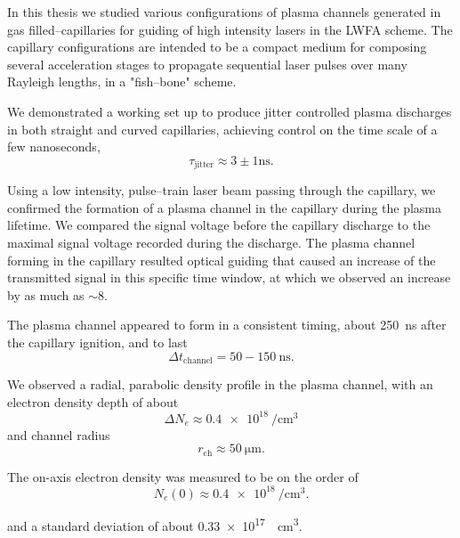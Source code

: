 \documentclass[../main.tex]{subfiles}
\begin{document}
In this thesis we studied various configurations of plasma channels generated in gas filled--capillaries for guiding of high intensity lasers in the LWFA scheme. The capillary configurations are intended to be a compact medium for composing several acceleration stages to propagate sequential laser pulses over many Rayleigh lengths, in a "fish--bone" scheme.

We demonstrated a working set up to produce jitter controlled plasma discharges in both straight and curved capillaries, achieving control on the time scale of a few nanoseconds\cite{andBeharEhudLowCapillary,BiagioniGasPulse},
\begin{equation*}
    	\tau_\text{jitter}\approx 3\pm 1\si{\ns}.
\end{equation*}

Using a low intensity, pulse--train laser beam passing through the capillary, we confirmed the formation of a plasma channel in the capillary during the plasma lifetime. We compared the signal voltage before the capillary discharge to the maximal signal voltage recorded during the discharge. The plasma channel forming in the capillary resulted optical guiding that caused an increase of the transmitted signal in this specific time window, at which we observed an increase by as much as $\sim 8$.

The plasma channel appeared to form in a consistent timing, about \SI{250}{\ns} after the capillary ignition, and to last 
\begin{equation*}
    \Delta t_\text{channel}=50-150\ \si{\ns}.
\end{equation*}

We observed a radial, parabolic density profile in the plasma channel, with an electron density depth of about 
$$\Delta N_e \approx\SI{0.4e18}{\per\cubic\cm}$$
and channel radius
$$r_\text{ch}\approx \SI{50}{\um}.$$

The on-axis electron density was measured to be on the order of $$N_e(0)\approx \SI{0.4e18}{\per\cubic\cm}.$$

and a standard deviation of about \SI{0.33e17}{\per\cubic\cm}.
\end{document}
